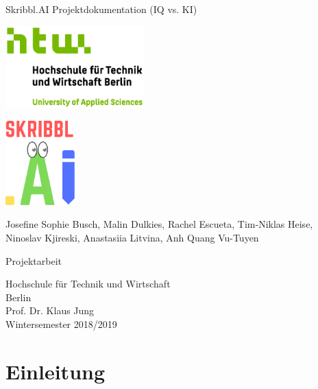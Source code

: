 \documentclass[11pt]{article}
\begin{document}
\begin{titlepage}
   \begin{center}
       \vspace*{1cm}

       \Huge
       Skribbl.AI Projektdokumentation (IQ vs. KI)
       \vspace{1.5cm}

       \includegraphics[width=0.4\textwidth]{images/logo_htw.jpg}

       \vspace{1.0cm}
       \includegraphics[width=0.2\textwidth]{images/logo_skribbl.png}
       \vspace{1.0cm}

       \LARGE

       Josefine Sophie Busch, Malin Dulkies, Rachel Escueta, Tim-Niklas Heise, Ninoslav Kjireski, Anastasiia Litvina, Anh Quang Vu-Tuyen

       \vfill

       Projektarbeit \\

       \vspace{0.8cm}

       Hochschule für Technik und Wirtschaft\\
       Berlin\\

       Prof. Dr. Klaus Jung\\
       Wintersemester 2018/2019\\
       
	\end{center}
\end{titlepage}
\pagebreak
\tableofcontents
\pagebreak
\listoftables
\listoffigures
\pagebreak
{}
\section{Einleitung}
\label{chap: Einleitung}
\end{document}
